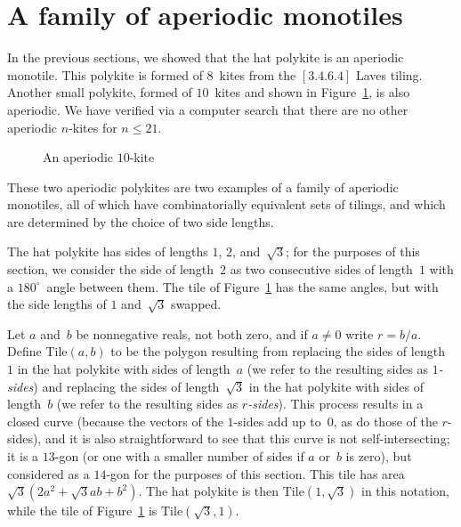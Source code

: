 \section{A family of aperiodic monotiles}
\label{sec:family}

In the previous sections, we showed that the hat polykite
is an aperiodic monotile.  This polykite is
formed of $8$~kites from the $[3.4.6.4]$ Laves tiling.  Another small
polykite, formed of $10$~kites and shown in Figure~\ref{fig:tileb}, is
also aperiodic.  We have verified via a computer search that there are no 
other aperiodic $n$-kites for $n \le 21$.

\begin{figure}[htp!]
\begin{center}
\end{center}
\caption{An aperiodic $10$-kite}
\label{fig:tileb}
\end{figure}

These two aperiodic polykites are two examples of a family of
aperiodic monotiles, all of which have combinatorially equivalent sets
of tilings, and which are determined by the choice of two side
lengths.

The hat polykite has sides of lengths $1$, $2$, and~$\sqrt{3}$; for the
purposes of this section, we consider the side of length~$2$ as two
consecutive sides of length~$1$ with a $180^\circ$~angle between them.
The tile of Figure~\ref{fig:tileb} has the same angles, but with the
side lengths of $1$ and~$\sqrt{3}$ swapped.

Let $a$ and~$b$ be nonnegative reals, not both zero, and if $a\ne 0$
write $r = b / a$.
Define $\mathrm{Tile}(a, b)$ to be the polygon resulting from replacing the sides of
length~$1$ in the hat polykite with sides of length~$a$ (we
refer to the resulting sides as \emph{$1$-sides}) and replacing the
sides of length~$\sqrt{3}$ in the hat polykite with sides of
length~$b$ (we refer to the resulting sides as \emph{$r$-sides}).
This process results in a closed curve (because the vectors of the
$1$-sides add up to~$0$, as do those of the $r$-sides), and it is also
straightforward to see that this curve is not self-intersecting; it is
a $13$-gon (or one with a smaller number of sides if $a$ or~$b$ is
zero), but considered as a $14$-gon for the purposes of this section.
This tile has area~$\sqrt{3}(2a^2+\sqrt{3}ab+b^2)$.  The hat polykite
is then $\mathrm{Tile}(1, \sqrt{3})$ in this notation, while the tile of
Figure~\ref{fig:tileb} is $\mathrm{Tile}(\sqrt{3}, 1)$.


